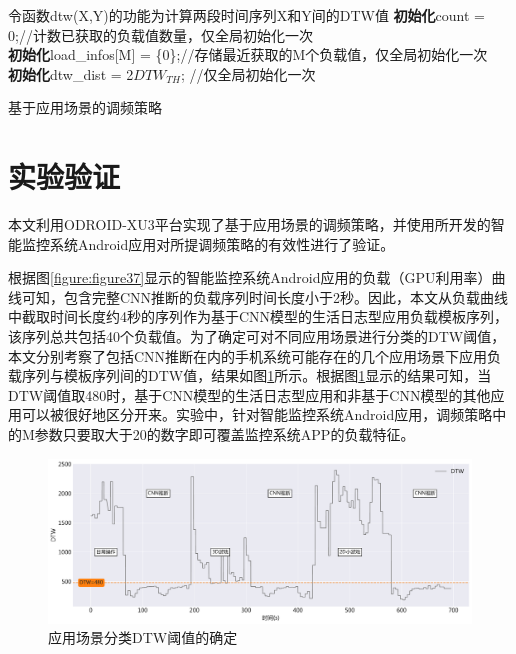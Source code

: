 \begin{algorithm}[htbp]
  \small
  \SetAlgoLined
    令函数dtw(X,Y)的功能为计算两段时间序列X和Y间的DTW值\;
    \textbf{初始化}count = 0;//计数已获取的负载值数量，仅全局初始化一次 \\
    \textbf{初始化}load\_infos[M] = \{0\};//存储最近获取的M个负载值，仅全局初始化一次 \\
    \textbf{初始化}dtw\_dist = 2$DTW_{TH}$; //仅全局初始化一次 \\

  \caption{基于应用场景的调频策略}
  \label{algo:algorithm10}
\end{algorithm}

\section{实验验证}

本文利用ODROID-XU3平台实现了基于应用场景的调频策略，并使用所开发的智能监控系统Android应用对所提调频策略的有效性进行了验证。

根据图\ref{figure:figure37}显示的智能监控系统Android应用的负载（GPU利用率）曲线可知，包含完整CNN推断的负载序列时间长度小于2秒。因此，本文从负载曲线中截取时间长度约4秒的序列作为基于CNN模型的生活日志型应用负载模板序列，该序列总共包括40个负载值。为了确定可对不同应用场景进行分类的DTW阈值，本文分别考察了包括CNN推断在内的手机系统可能存在的几个应用场景下应用负载序列与模板序列间的DTW值，结果如图\ref{figure:figure41}所示。根据图\ref{figure:figure41}显示的结果可知，当DTW阈值取480时，基于CNN模型的生活日志型应用和非基于CNN模型的其他应用可以被很好地区分开来。实验中，针对智能监控系统Android应用，调频策略中的M参数只要取大于20的数字即可覆盖监控系统APP的负载特征。

\begin{figure}[htbp]
    \centering
    \includegraphics[width=1.0\textwidth]{figures/system_dtw.pdf}
    \caption{应用场景分类DTW阈值的确定}\label{figure:figure41}
\end{figure}

